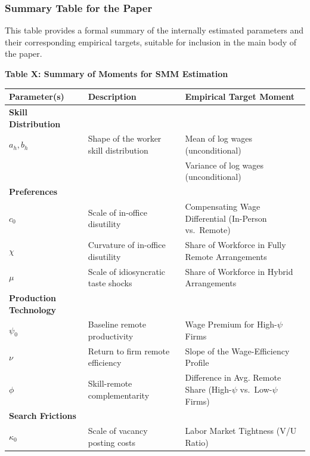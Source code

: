 \documentclass[
  11pt,
  letterpaper,
  DIV=11,
  numbers=noendperiod]{scrartcl}
\begin{document}
\subsubsection{\texorpdfstring{\textbf{Summary Table for the
Paper}}{Summary Table for the Paper}}\label{summary-table-for-the-paper}

This table provides a formal summary of the internally estimated
parameters and their corresponding empirical targets, suitable for
inclusion in the main body of the paper.

\textbf{Table X: Summary of Moments for SMM Estimation}

\begin{longtable}[]{@{}
  >{\raggedright\arraybackslash}p{}
  >{\raggedright\arraybackslash}p{}
  >{\raggedright\arraybackslash}p{}@{}}
\toprule\noalign{}
\begin{minipage}[b]{\linewidth}\raggedright
Parameter(s)
\end{minipage} & \begin{minipage}[b]{\linewidth}\raggedright
Description
\end{minipage} & \begin{minipage}[b]{\linewidth}\raggedright
Empirical Target Moment
\end{minipage} \\
\midrule\noalign{}
\endhead
\bottomrule\noalign{}
\endlastfoot
\textbf{Skill Distribution} & & \\
\(a_h, b_h\) & Shape of the worker skill distribution & Mean of log
wages (unconditional) \\
& & Variance of log wages (unconditional) \\
\textbf{Preferences} & & \\
\(c_0\) & Scale of in-office disutility & Compensating Wage Differential
(In-Person vs.~Remote) \\
\(\chi\) & Curvature of in-office disutility & Share of Workforce in
Fully Remote Arrangements \\
\(\mu\) & Scale of idiosyncratic taste shocks & Share of Workforce in
Hybrid Arrangements \\
\textbf{Production Technology} & & \\
\(\psi_0\) & Baseline remote productivity & Wage Premium for
High-\(\psi\) Firms \\
\(\nu\) & Return to firm remote efficiency & Slope of the
Wage-Efficiency Profile \\
\(\phi\) & Skill-remote complementarity & Difference in Avg. Remote
Share (High-\(\psi\) vs.~Low-\(\psi\) Firms) \\
\textbf{Search Frictions} & & \\
\(\kappa_0\) & Scale of vacancy posting costs & Labor Market Tightness
(V/U Ratio) \\
\end{longtable}
\end{document}
